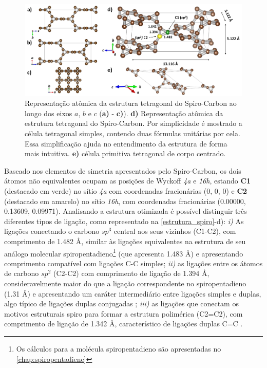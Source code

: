 	\begin{figure}[hbt!]
		\centering
		\includegraphics[width=1\linewidth]{capitulos/fig/results1/estrutura_spiro}
		\caption{Representação atômica da estrutura tetragonal do Spiro-Carbon ao longo dos eixos $a$, $b$ e $c$ (\textbf{a)} - \textbf{c)}). \textbf{d)} Representação atômica da estrutura tetragonal do Spiro-Carbon. Por simplicidade é mostrado a célula tetragonal simples, contendo duas fórmulas unitárias por cela. Essa simplificação ajuda no entendimento da estrutura de forma mais intuitiva. \textbf{e)} célula primitiva tetragonal de corpo centrado.}
		\label{estrutura_spiro}
	\end{figure}

	Baseado nos elementos de simetria apresentados pelo Spiro-Carbon, os dois átomos não equivalentes ocupam as posições de Wyckoff \textit{4a} e \textit{16h}, estando \textbf{C1} (destacado em verde) no sítio \textit{4a} com coordenadas fracionárias (0, 0, 0) e \textbf{C2} (destacado em amarelo) no sítio \textit{16h}, com coordenadas fracionárias (0.00000,  0.13609,  0.09971). Analisando a estrutura otimizada é possível distinguir três diferentes tipos de ligação, como representado na \autoref{estrutura_spiro}-d): \textit{i)} As ligações conectando o carbono $sp^3$ central aos seus vizinhos (C1-C2), com comprimento de 1.482 Å, similar às ligações equivalentes na estrutura de seu análogo molecular spiropentadieno\footnote{Os cálculos para a molécula spiropentadieno são apresentadas no \autoref{chap:spiropentadiene}} (que apresenta 1.483 Å) e apresentando comprimento compatível com ligações C-C simples; \textit{ii)} as ligações entre os átomos de carbono $sp^2$ (C2-C2) com comprimento de ligação de 1.394 Å, consideravelmente maior do que a ligação correspondente no spiropentadieno (1.31 Å) e apresentando um caráter intermediário entre ligações simples e duplas, algo típico de ligações duplas conjugadas \cite{lide1962survey}; \textit{iii)} as ligações que conectam os motivos estruturais spiro para formar a estrutura polimérica (C2=C2), com comprimento de ligação de 1.342 \AA, característico de ligações duplas C=C \cite{zavitsas2003relation,lide1962survey}.  
	
